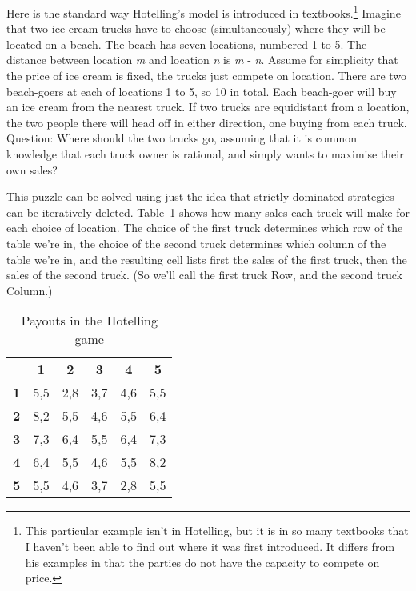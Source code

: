 \documentclass[
  10pt,
  letterpaper,
  twoside]{scrbook}
\begin{document}
Here is the standard way Hotelling's model is introduced in
textbooks.\footnote{This particular example isn't in Hotelling, but it
  is in so many textbooks that I haven't been able to find out where it
  was first introduced. It differs from his examples in that the parties
  do not have the capacity to compete on price.} Imagine that two ice
cream trucks have to choose (simultaneously) where they will be located
on a beach. The beach has seven locations, numbered 1 to 5. The distance
between location \emph{m} and location \emph{n} is \textbar{}\emph{m} -
\emph{n}\textbar. Assume for simplicity that the price of ice cream is
fixed, the trucks just compete on location. There are two beach-goers at
each of locations 1 to 5, so 10 in total. Each beach-goer will buy an
ice cream from the nearest truck. If two trucks are equidistant from a
location, the two people there will head off in either direction, one
buying from each truck. Question: Where should the two trucks go,
assuming that it is common knowledge that each truck owner is rational,
and simply wants to maximise their own sales?

This puzzle can be solved using just the idea that strictly dominated
strategies can be iteratively deleted. Table~\ref{tbl-hotelling} shows
how many sales each truck will make for each choice of location. The
choice of the first truck determines which row of the table we're in,
the choice of the second truck determines which column of the table
we're in, and the resulting cell lists first the sales of the first
truck, then the sales of the second truck. (So we'll call the first
truck Row, and the second truck Column.)

\clearpage

\begin{longtable}[]{@{}rccccc@{}}
\caption{Payouts in the Hotelling
game}\label{tbl-hotelling}\tabularnewline
\toprule\noalign{}
\endfirsthead
\endhead
\bottomrule\noalign{}
\endlastfoot
& \textbf{1} & \textbf{2} & \textbf{3} & \textbf{4} & \textbf{5} \\
\textbf{1} & 5,5 & 2,8 & 3,7 & 4,6 & 5,5 \\
\textbf{2} & 8,2 & 5,5 & 4,6 & 5,5 & 6,4 \\
\textbf{3} & 7,3 & 6,4 & 5,5 & 6,4 & 7,3 \\
\textbf{4} & 6,4 & 5,5 & 4,6 & 5,5 & 8,2 \\
\textbf{5} & 5,5 & 4,6 & 3,7 & 2,8 & 5,5 \\
\end{longtable}
\end{document}
